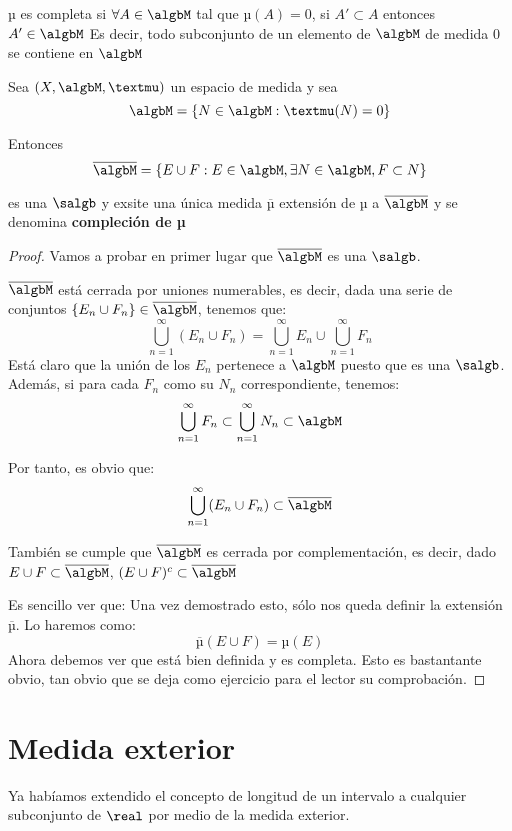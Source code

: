 \documentclass{apuntes}
\begin{document}
\begin{defn}
µ es completa si $\forall A \in \algbM$ tal que $µ(A)=0$, si $A'\subset A$ entonces $A' \in \algbM$
Es decir, todo subconjunto de un elemento de $\algbM$ de medida 0 se contiene en $\algbM$
\end{defn}

\begin{theorem}
Sea $(X, \algbM, µ)$ un espacio de medida y sea
\[\algbM = \{N \in \algbM: µ(N)=0\}\]

Entonces
\[\overline{\algbM}=\{E \cup F: E \in \algbM, \exists N \in \algbM, F \subset N\}\]

es una $\salgb$ y exsite una única medida $\overline{µ}$ extensión de µ a $\overline{\algbM}$ y se denomina \textbf{compleción de µ}
\end{theorem}
\begin{proof}
Vamos a probar en primer lugar que $\overline{\algbM}$ es una $\salgb$.

$\overline{\algbM}$ está cerrada por uniones numerables, es decir, dada una serie de conjuntos $\{E_n \cup F_n\}\in \overline{\algbM}$, tenemos que:
\[\bigcup_{n=1}^{\infty}(E_n \cup F_n) =\bigcup_{n=1}^{\infty}E_n \cup \bigcup_{n=1}^{\infty} F_n \]
Está claro que la unión de los $E_n$ pertenece a $\algbM$ puesto que es una $\salgb$. Además, si para cada $F_n$ como su $N_n$ correspondiente, tenemos:
\[\bigcup_{n=1}^{\infty}F_n \subset \bigcup_{n=1}^{\infty}N_n \subset \algbM\]

Por tanto, es obvio que:
\[\bigcup_{n=1}^{\infty}(E_n \cup F_n) \subset \overline{\algbM}\]

También se cumple que $\overline{\algbM}$ es cerrada por complementación, es decir, dado $E\cup F \subset \overline{\algbM}$, $(E \cup F)^c\subset \overline{\algbM}$

Es sencillo ver que:
Una vez demostrado esto, sólo nos queda definir la extensión $\overline{µ}$. Lo haremos como:
\[\overline{µ}(E \cup F) = µ(E)\]
Ahora debemos ver que está bien definida y es completa. Esto es bastantante obvio, tan obvio que se deja como ejercicio para el lector su comprobación.
\end{proof}

\section{Medida exterior}
Ya habíamos extendido el concepto de longitud de un intervalo a cualquier subconjunto de $\real$ por medio de la medida exterior.
\end{document}
